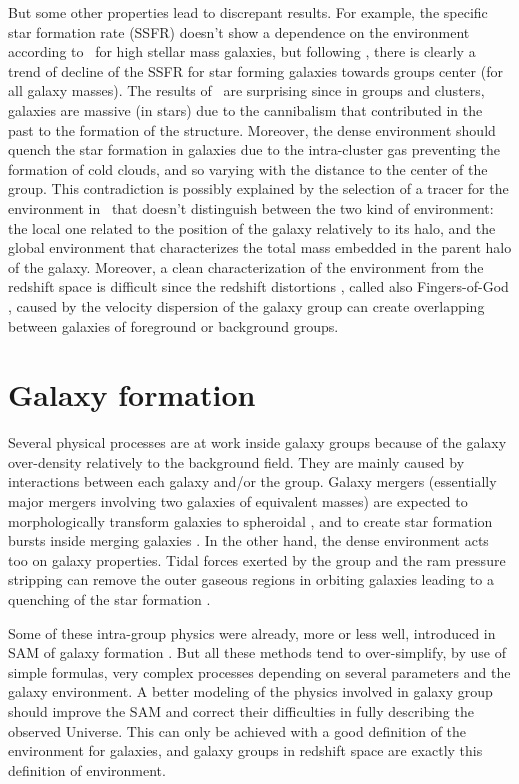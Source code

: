 But some other properties lead to discrepant results. For example, the
specific star formation rate (SSFR) doesn't show a dependence on the
environment according to~\cite{Peng+10} for high stellar mass galaxies, but
following \citet{vonderLinden+10}, there is clearly a trend of decline of
the SSFR for star forming galaxies towards groups center (for all galaxy
masses). The results of~\cite{Peng+10} are surprising since in groups and
clusters, galaxies are massive (in stars) due to the cannibalism that
contributed in the past to the formation of the structure. Moreover, the
dense environment should quench the star formation in galaxies due to the
intra-cluster gas preventing the formation of cold clouds, and so varying
with the distance to the center of the group. This contradiction is possibly
explained by the selection of a tracer for the environment in~\cite{Peng+10}
that doesn't distinguish between the two kind of environment: the local one
related to the position of the galaxy relatively to its halo, and the global
environment that characterizes the total mass embedded in the parent halo of
the galaxy. Moreover, a clean characterization of the environment from the
redshift space is difficult since the redshift distortions
\citep{Jackson+72}, called also Fingers-of-God \citep{Tully+78}, caused by
the velocity dispersion of the galaxy group can create overlapping between
galaxies of foreground or background groups.

\section{Galaxy formation}
\label{sec:galaxy_formation}

Several physical processes are at work inside galaxy groups because of the
galaxy over-density relatively to the background field. They are mainly
caused by interactions between each galaxy and/or the group. Galaxy mergers
(essentially major mergers involving two galaxies of equivalent masses) are
expected to morphologically transform galaxies to spheroidal
\citep{Naab+99,Bournaud+05}, and to create star formation bursts inside
merging galaxies \citep{Cox+08,Teyssier+10}. In the other hand, the dense
environment acts too on galaxy properties. Tidal forces exerted by the group
and the ram pressure stripping can remove the outer gaseous regions in
orbiting galaxies leading to a quenching of the star formation
\citep{Larson+80,Bekki+13}.

Some of these intra-group physics were already, more or less well,
introduced in SAM of galaxy formation
\citep{Okamoto+03,Lanzoni+05,Font+08,Guo+11}. But all these methods tend to
over-simplify, by use of simple formulas, very complex processes depending
on several parameters and the galaxy environment. A better modeling of the
physics involved in galaxy group should improve the SAM and correct their
difficulties in fully describing the observed Universe. This can only be
achieved with a good definition of the environment for galaxies, and galaxy
groups in redshift space are exactly this definition of environment.

